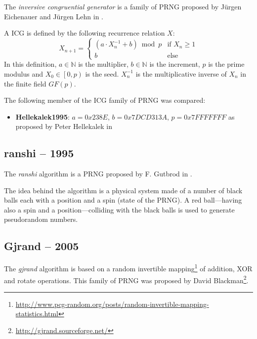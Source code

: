     The \emph{inversive congruential generator} is a family of PRNG proposed by Jürgen Eichenauer and Jürgen Lehn in \cite{Eichenauer:1986}.

    A ICG is defined by the following recurrence relation $X$:
    \begin{equation*}
        X_{n + 1} = \begin{cases}
                        \left(a \cdot X_n^{-1} + b\right) \bmod p & \text{if } X_n \geq 1 \\
                        b                                         & \text{else}
                    \end{cases}
    \end{equation*}
    In this definition, $a \in \mathbb{N}$ is the multiplier, $b \in \mathbb{N}$ is the increment, $p$ is the prime modulus and $X_0 \in \left[0, p\right)$ is the seed. $X_n^{-1}$ is the multiplicative inverse of $X_n$ in the finite field $GF\left(p\right)$.

    The following member of the ICG family of PRNG was compared:
    \begin{itemize}
        \itemsep0em
        \item \textbf{Hellekalek1995}: $a = 0x238E$, $b = 0x7DCD313A$, $p = 0x7FFFFFFF$ as proposed by Peter Hellekalek in \cite{Hellekalek:1995}
    \end{itemize}

\subsection[Ranshi -- 1995]{ranshi -- 1995} \label{subsec:ranshi}

    The \emph{ranshi} algorithm is a PRNG proposed by F. Gutbrod in \cite{Gutbrod:1995}.

    The idea behind the algorithm is a physical system made of a number of black balls each with a position and a spin (state of the PRNG). A red ball---having also a spin and a position---colliding with the black balls is used to generate pseudorandom numbers.

\subsection[Gjrand -- 2005]{Gjrand -- 2005} \label{subsec:gjrand}

    The \emph{gjrand} algorithm is based on a random invertible mapping\footnote[5]{\url{http://www.pcg-random.org/posts/random-invertible-mapping-statistics.html}} of addition, XOR and rotate operations. This family of PRNG was proposed by David Blackman\footnote[6]{\url{http://gjrand.sourceforge.net/}}.

